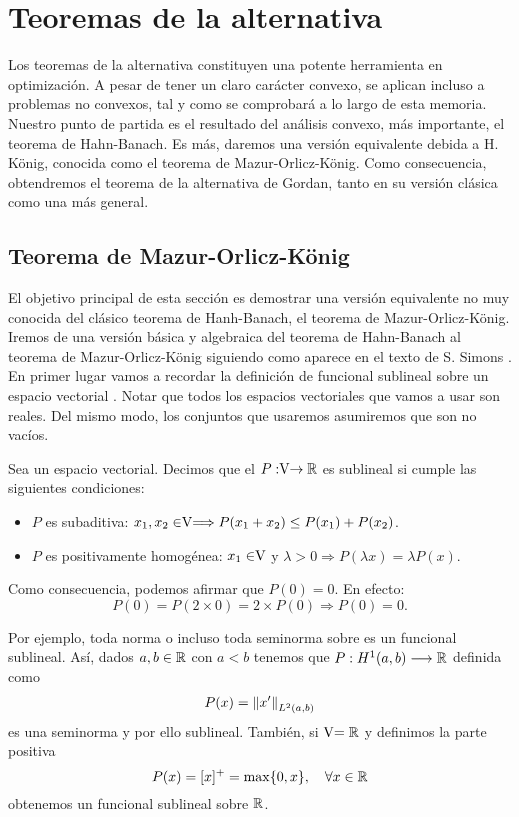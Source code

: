 \chapter{Teoremas de la alternativa}
Los teoremas de la alternativa constituyen una potente herramienta en optimización. A pesar de tener un claro carácter convexo, se aplican incluso a problemas no convexos, tal y como se comprobará a lo largo de esta memoria. Nuestro punto de partida es el resultado del análisis  convexo, más importante, el teorema de Hahn-Banach. Es más, daremos una versión equivalente debida a H. König, conocida como el teorema de Mazur-Orlicz-König. Como consecuencia, obtendremos el teorema de la alternativa de Gordan, tanto en su versión clásica como una más general. 

\section{Teorema de Mazur-Orlicz-König}
El objetivo principal de esta sección es demostrar una versión equivalente no muy conocida del clásico teorema de Hanh-Banach, el teorema de Mazur-Orlicz-König. Iremos de una versión básica y algebraica del teorema de Hahn-Banach al teorema de Mazur-Orlicz-König siguiendo como aparece en el texto de S. Simons \cite{Simons2008}. \\
	
En primer lugar vamos a recordar la definición de funcional sublineal sobre un espacio vectorial \vecSpace. Notar que todos los espacios vectoriales que vamos a usar son reales. Del mismo modo, los conjuntos que usaremos asumiremos que son no vacíos.
	
\begin{definicion}
Sea \vecSpace un espacio vectorial. Decimos que el $P:\vecSpace \rightarrow \RR$ es sublineal si cumple las siguientes condiciones:
	\begin{itemize}
		\item $ P $ es subaditiva: $x_1, x_2 \in \vecSpace \Longrightarrow P(x_1 + x_2) \leq P(x_1) + P(x_2) $.
		\item $ P $ es positivamente homogénea: $x_1 \in \vecSpace $ y $ \lambda > 0 \Longrightarrow P(\lambda x) = \lambda P(x) $.
	\end{itemize}
\end{definicion}

Como consecuencia, podemos afirmar que $ P(0) = 0 $. En efecto:
\[
P(0) = P(2\times0) = 2\times P(0) \Longrightarrow P(0) = 0.
\]

Por ejemplo, toda norma o incluso toda seminorma sobre \vecSpace es un funcional sublineal. Así, dados $ a,b \in \mathbb{R} $ con $ a <b $ tenemos que $ P:H^{1} (a,b) \longrightarrow \mathbb{R}$ definida como \[ P(x) = \left\Vert x'\right\Vert_{L^2(a,b)} \] es una seminorma y por ello sublineal. También, si $ \vecSpace = \RR $ y definimos la parte positiva \[ P(x) = [x]^{+} = \max \{0,x\}, \quad \forall x \in \mathbb{R} \] obtenemos un funcional sublineal sobre $\mathbb{R}$. \\
	
